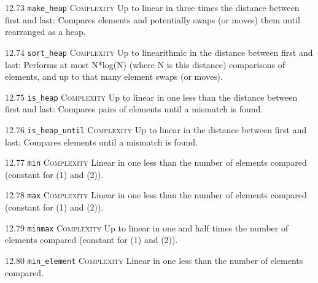 \noindent\textcolor{corange}{12.73 \texttt{make\_heap}} \textsc{Complexity} Up to linear in three times the distance between first and last: Compares elements and potentially swaps (or moves) them until rearranged as a heap. \vspace{0.5em}

\noindent\textcolor{cred}{12.74 \texttt{sort\_heap}} \textsc{Complexity} Up to linearithmic in the distance between first and last: Performs at most N*log(N) (where N is this distance) comparisons of elements, and up to that many element swaps (or moves). \vspace{0.5em}

\noindent\textcolor{corange}{12.75 \texttt{is\_heap}} \textsc{Complexity} Up to linear in one less than the distance between first and last: Compares pairs of elements until a mismatch is found. \vspace{0.5em}

\noindent\textcolor{corange}{12.76 \texttt{is\_heap\_until}} \textsc{Complexity} Up to linear in the distance between first and last: Compares elements until a mismatch is found. \vspace{0.5em}

\noindent\textcolor{corange}{12.77 \texttt{min}} \textsc{Complexity} Linear in one less than the number of elements compared (constant for (1) and (2)). \vspace{0.5em}

\noindent\textcolor{corange}{12.78 \texttt{max}} \textsc{Complexity} Linear in one less than the number of elements compared (constant for (1) and (2)). \vspace{0.5em}

\noindent\textcolor{corange}{12.79 \texttt{minmax}} \textsc{Complexity} Up to linear in one and half times the number of elements compared (constant for (1) and (2)). \vspace{0.5em}

\noindent\textcolor{corange}{12.80 \texttt{min\_element}} \textsc{Complexity} Linear in one less than the number of elements compared. \vspace{0.5em}

